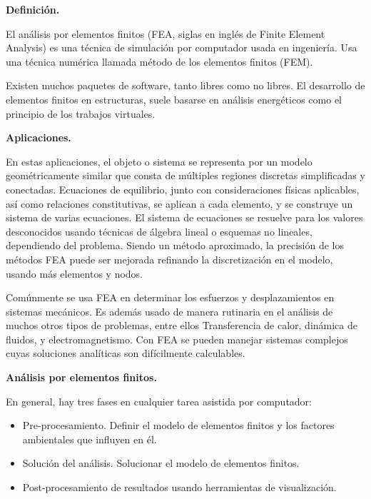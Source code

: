 \documentclass[a4paper,10pt]{article}
\begin{document}
\textbf{Definición.}

\hfill

El análisis por elementos finitos (FEA, siglas en inglés de Finite Element Analysis) es una técnica de simulación por computador usada en ingeniería. Usa una técnica numérica llamada método de los elementos finitos (FEM).

Existen muchos paquetes de software, tanto libres como no libres. El desarrollo de elementos finitos en estructuras, suele basarse en análisis energéticos como el principio de los trabajos virtuales.

\hfill

\textbf{Aplicaciones.}

\hfill

En estas aplicaciones, el objeto o sistema se representa por un modelo geométricamente similar que consta de múltiples regiones discretas simplificadas y conectadas. Ecuaciones de equilibrio, junto con consideraciones físicas aplicables, así como relaciones constitutivas, se aplican a cada elemento, y se construye un sistema de varias ecuaciones. El sistema de ecuaciones se resuelve para los valores desconocidos usando técnicas de álgebra lineal o esquemas no lineales, dependiendo del problema. Siendo un método aproximado, la precisión de los métodos FEA puede ser mejorada refinando la discretización en el modelo, usando más elementos y nodos.

Comúnmente se usa FEA en determinar los esfuerzos y desplazamientos en sistemas mecánicos. Es además usado de manera rutinaria en el análisis de muchos otros tipos de problemas, entre ellos Transferencia de calor, dinámica de fluidos, y electromagnetismo. Con FEA se pueden manejar sistemas complejos cuyas soluciones analíticas son difícilmente calculables.

\hfill

\textbf{Análisis por elementos finitos.}

\hfill

En general, hay tres fases en cualquier tarea asistida por computador:

\begin{itemize}
 \item Pre-procesamiento. Definir el modelo de elementos finitos y los factores ambientales que influyen en él.
 \item Solución del análisis. Solucionar el modelo de elementos finitos.
 \item Post-procesamiento de resultados usando herramientas de visualización.
\end{itemize}
\end{document}
